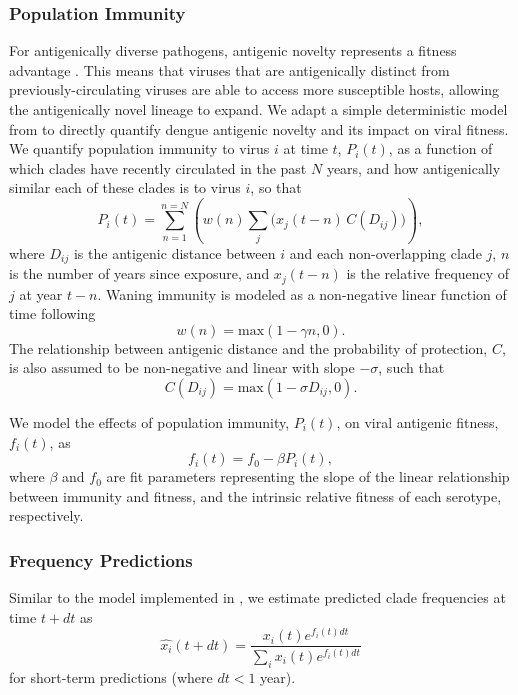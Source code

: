 \documentclass[11pt,oneside,letterpaper]{article}
\begin{document}
\subsubsection*{Population Immunity}
For antigenically diverse pathogens, antigenic novelty represents a fitness advantage \citep{lipsitch2007patterns}.
This means that viruses that are antigenically distinct from previously-circulating viruses are able to access more susceptible hosts, allowing the antigenically novel lineage to expand.
We adapt a simple deterministic model from \citet{luksza2014predictive} to directly quantify dengue antigenic novelty and its impact on viral fitness.
We quantify population immunity to virus $i$ at time $t$, $P_i(t)$, as a function of which clades have recently circulated in the past $N$ years, and how antigenically similar each of these clades is to virus $i$, so that
\begin{equation}
  \label{eq_population_immunity}
P_i(t) = \sum_{n=1}^{n=N} \left(w(n)  \sum_{j} \Big( x_j(t-n) \, C( D_{ij}) \Big) \right),
\end{equation}
where $D_{ij}$ is the antigenic distance between $i$ and each non-overlapping clade $j$, $n$ is the number of years since exposure, and $x_j(t-n)$ is the relative frequency of $j$ at year $t-n$.
Waning immunity is modeled as a non-negative linear function of time following
\begin{equation}
\label{eq_waning_immunity}
  w(n) = \mathrm{max}(1 - \gamma n, 0).
\end{equation}
The relationship between antigenic distance and the probability of protection, $C$, is also assumed to be non-negative and linear with slope $-\sigma$, such that
\begin{equation}
C(D_{ij}) = \mathrm{max}(1 - \sigma D_{ij}, 0).
\end{equation}

We model the effects of population immunity, $P_i(t)$, on viral antigenic fitness, $f_i(t)$, as
\begin{equation}
  \label{eq_fitness}
f_i(t) = f_0-\beta P_i(t),
\end{equation}
where $\beta$ and $f_0$ are fit parameters representing the slope of the linear relationship between immunity and fitness, and the intrinsic relative fitness of each serotype, respectively.

\subsubsection*{Frequency Predictions}
Similar to the model implemented in \citet{luksza2014predictive}, we estimate predicted clade frequencies at time $t + dt$ as
\begin{equation}
  \label{eq_predict_frequency}
\hat{x_i}(t+dt) = \frac{x_i(t) e^{f_i(t) dt}}{\sum_{i}x_i(t) e^{f_i(t) dt}}
\end{equation}
for short-term predictions (where $dt < 1$ year).
\end{document}
